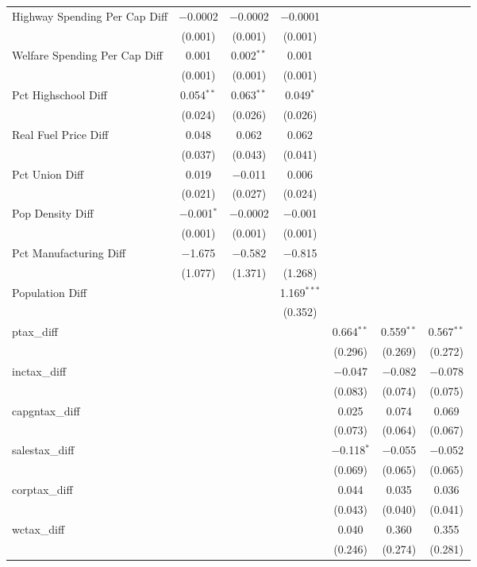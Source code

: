 \begin{table}[!htbp]
\begin{tabular}{@{\extracolsep{5pt}}lcccccc}
  Highway Spending Per Cap Diff & $-$0.0002 & $-$0.0002 & $-$0.0001 &  &  &  \\ 
  & (0.001) & (0.001) & (0.001) &  &  &  \\ 
  Welfare Spending Per Cap Diff & 0.001 & 0.002$^{**}$ & 0.001 &  &  &  \\ 
  & (0.001) & (0.001) & (0.001) &  &  &  \\ 
  Pct Highschool Diff & 0.054$^{**}$ & 0.063$^{**}$ & 0.049$^{*}$ &  &  &  \\ 
  & (0.024) & (0.026) & (0.026) &  &  &  \\ 
  Real Fuel Price Diff & 0.048 & 0.062 & 0.062 &  &  &  \\ 
  & (0.037) & (0.043) & (0.041) &  &  &  \\ 
  Pct Union Diff & 0.019 & $-$0.011 & 0.006 &  &  &  \\ 
  & (0.021) & (0.027) & (0.024) &  &  &  \\ 
  Pop Density Diff & $-$0.001$^{*}$ & $-$0.0002 & $-$0.001 &  &  &  \\ 
  & (0.001) & (0.001) & (0.001) &  &  &  \\ 
  Pct Manufacturing Diff & $-$1.675 & $-$0.582 & $-$0.815 &  &  &  \\ 
  & (1.077) & (1.371) & (1.268) &  &  &  \\ 
  Population Diff &  &  & 1.169$^{***}$ &  &  &  \\ 
  &  &  & (0.352) &  &  &  \\ 
  ptax\_diff &  &  &  & 0.664$^{**}$ & 0.559$^{**}$ & 0.567$^{**}$ \\ 
  &  &  &  & (0.296) & (0.269) & (0.272) \\ 
  inctax\_diff &  &  &  & $-$0.047 & $-$0.082 & $-$0.078 \\ 
  &  &  &  & (0.083) & (0.074) & (0.075) \\ 
  capgntax\_diff &  &  &  & 0.025 & 0.074 & 0.069 \\ 
  &  &  &  & (0.073) & (0.064) & (0.067) \\ 
  salestax\_diff &  &  &  & $-$0.118$^{*}$ & $-$0.055 & $-$0.052 \\ 
  &  &  &  & (0.069) & (0.065) & (0.065) \\ 
  corptax\_diff &  &  &  & 0.044 & 0.035 & 0.036 \\ 
  &  &  &  & (0.043) & (0.040) & (0.041) \\ 
  wctax\_diff &  &  &  & 0.040 & 0.360 & 0.355 \\ 
  &  &  &  & (0.246) & (0.274) & (0.281) \\ 

\end{tabular}
\end{table}
